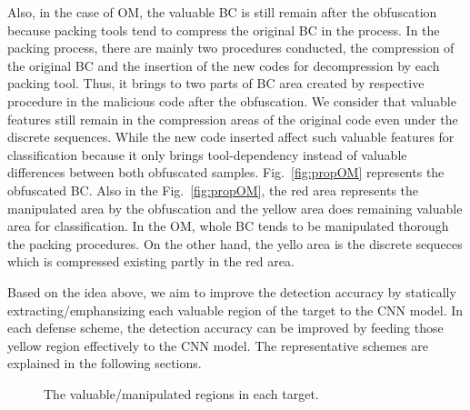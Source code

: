 \documentclass{ieeeaccess}
\newcommand{\myfigurename}{Fig.}
\begin{document}
Also, in the case of OM, the valuable BC is still remain after the obfuscation because packing tools tend to compress the original BC in the process.
In the packing process, there are mainly two procedures conducted, the compression of the original BC and the insertion of the new codes for decompression by each packing tool. %
Thus, it brings to two parts of BC area created by respective procedure in the malicious code after the obfuscation. %
We consider that valuable features still remain in the compression areas of the original code even under the discrete sequences.
While the new code inserted affect such valuable features for classification because it only brings tool-dependency instead of valuable differences between both obfuscated samples.
\myfigurename~\ref{fig:propOM} represents the obfuscated BC.
Also in the \myfigurename~\ref{fig:propOM}, the red area represents the manipulated area by the obfuscation and the yellow area does remaining valuable area for classification.
In the OM, whole BC tends to be manipulated thorough the packing procedures.
On the other hand, the yello area is the discrete sequeces which is compressed existing partly in the red area.

Based on the idea above, we aim to improve the detection accuracy by statically extracting/emphansizing each valuable region of the target to the CNN model.
In each defense scheme, the detection accuracy can be improved by feeding those yellow region effectively to the CNN model.
The representative schemes are explained in the following sections.


\begin{figure}[t]
 \centering
 \caption{The valuable/manipulated regions in each target.}
 \label{fig:prop}
\end{figure}
\end{document}
